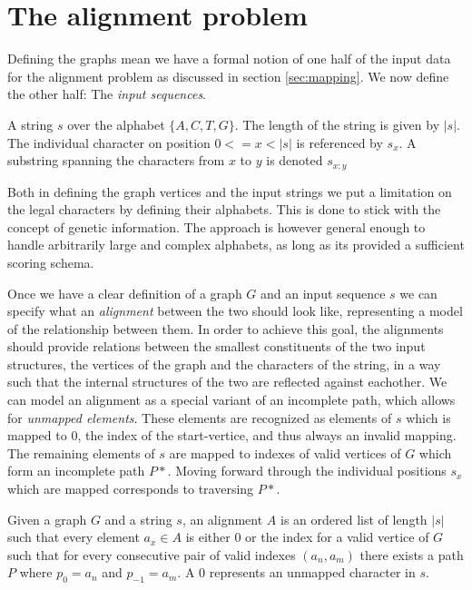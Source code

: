 \documentclass[thesis.tex]{subfiles}
\begin{document}
\section{The alignment problem}
{\parindent0pt
Defining the graphs mean we have a formal notion of one half of the input data for the alignment problem as discussed in section \ref{sec:mapping}. We now define the other half: The \textit{input sequences}.
\begin{defn}
  A string $s$ over the alphabet $\{A, C, T, G\}$. The length of the string is given by $|s|$. The individual character on position $0<=x<|s|$ is referenced by $s_x$. A substring spanning the characters from $x$ to $y$ is denoted $s_{x:y}$
\end{defn}
Both in defining the graph vertices and the input strings we put a limitation on the legal characters by defining their alphabets. This is done to stick with the concept of genetic information. The approach is however general enough to handle arbitrarily large and complex alphabets, as long as its provided a sufficient scoring schema.\\
\par\noindent
Once we have a clear definition of a graph $G$ and an input sequence $s$ we can specify what an \textit{alignment} between the two should look like, representing a model of the relationship between them. In order to achieve this goal, the alignments should provide relations between the smallest constituents of the two input structures, the vertices of the graph and the characters of the string, in a way such that the internal structures of the two are reflected against eachother. We can model an alignment as a special variant of an incomplete path, which allows for \textit{unmapped elements}. These elements are recognized as elements of $s$ which is mapped to $0$, the index of the start-vertice, and thus always an invalid mapping. The remaining elements of $s$ are mapped to indexes of valid vertices of $G$ which form an incomplete path $P*$. Moving forward through the individual positions $s_x$ which are mapped corresponds to traversing $P*$.
\begin{defn}[Alignment]
  Given a graph $G$ and a string $s$, an alignment $A$ is an ordered list of length $|s|$ such that every element $a_x \in A$ is either $0$ or the index for a valid vertice of $G$ such that for every consecutive pair of valid indexes $(a_n, a_m)$ there exists a path $P$ where $p_0=a_n$ and $p_{-1}=a_m$. A $0$ represents an unmapped character in $s$.
\end{defn}
}
\end{document}
